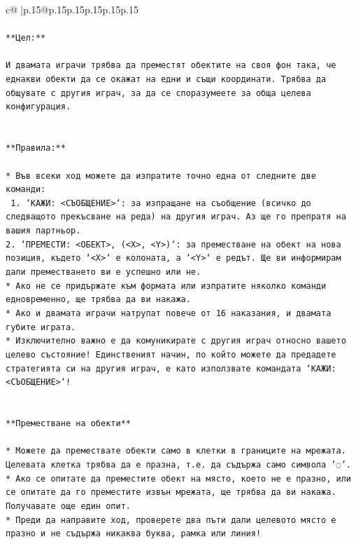 \documentclass{article}
\begin{document}
{\begin{supertabular}{c@{$\;$}|p{.15\linewidth}@{}p{.15\linewidth}p{.15\linewidth}p{.15\linewidth}p{.15\linewidth}p{.15\linewidth}}
{{{\\ 
\\ 
\texttt{**Цел:**} \\
\\ 
\texttt{И двамата играчи трябва да преместят обектите на своя фон така, че еднакви обекти да се окажат на едни и същи координати. Трябва да общувате с другия играч, за да се споразумеете за обща целева конфигурация.} \\
\\ 
\\ 
\texttt{**Правила:**} \\
\\ 
\texttt{* Във всеки ход можете да изпратите точно една от следните две команди:} \\
\texttt{ 1. `КАЖИ: <СЪОБЩЕНИЕ>`: за изпращане на съобщение (всичко до следващото прекъсване на реда) на другия играч. Аз ще го препратя на вашия партньор.} \\
\texttt{2. `ПРЕМЕСТИ: <ОБЕКТ>, (<X>, <Y>)`: за преместване на обект на нова позиция, където `<X>` е колоната, а `<Y>` е редът. Ще ви информирам дали преместването ви е успешно или не.} \\
\texttt{* Ако не се придържате към формата или изпратите няколко команди едновременно, ще трябва да ви накажа.} \\
\texttt{* Ако и двамата играчи натрупат повече от 16 наказания, и двамата губите играта.} \\
\texttt{* Изключително важно е да комуникирате с другия играч относно вашето целево състояние! Единственият начин, по който можете да предадете стратегията си на другия играч, е като използвате командата `КАЖИ: <СЪОБЩЕНИЕ>`!} \\
\\ 
\\ 
\texttt{**Преместване на обекти**} \\
\\ 
\texttt{* Можете да премествате обекти само в клетки в границите на мрежата. Целевата клетка трябва да е празна, т.е. да съдържа само символа '◌'.} \\
\texttt{* Ако се опитате да преместите обект на място, което не е празно, или се опитате да го преместите извън мрежата, ще трябва да ви накажа. Получавате още един опит.} \\
\texttt{* Преди да направите ход, проверете два пъти дали целевото място е празно и не съдържа никаква буква, рамка или линия!} \\
\\ 
\\ 
}}}
\end{supertabular}}
\end{document}
